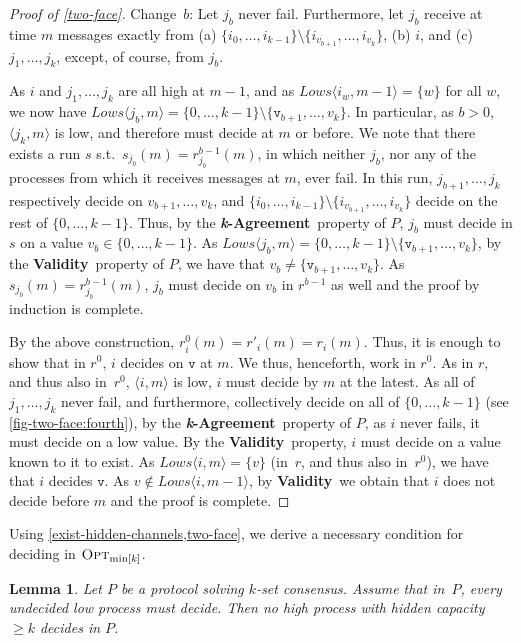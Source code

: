 \documentclass[11pt]{article}
\newtheorem{lemma}{Lemma}
\theoremstyle{definition}
\newcommand{\knownlows}[1]{\ensuremath{\mathit{Lows}\node{#1}}}
\newcommand{\OptMink}{\mbox{$\mbox{\sc Opt}_{\min[k]}$}}
\newcommand{\set}[1]{\{#1\}}
\newcommand{\defemph}[1]{\textbf{\textit{#1}}}
\newcommand{\node}[1]{\langle#1\rangle}
\newcommand{\kAgreement}{{\bf \defemph{k}-Agreement}}
\newcommand{\Validity}{{\bf Validity}}
\begin{document}
\begin{proof}[Proof of \cref{two-face}]
Change~$b$: Let $j_b$ never fail. Furthermore, let $j_b$ receive at time $m$
messages exactly from (a)
$\set{i_0,\ldots,i_{k-1}} \setminus \set{i_{v_{b+1}},\ldots,i_{v_k}}$,
(b)
$i$, and
(c)
$j_1,\ldots,j_k$, except, of course, from $j_b$.

As $i$ and $j_1,\ldots,j_k$ are all high at $m-1$, and as
$\knownlows{i_w,m-1} = \set{w}$ for all $w$, we now have
$\knownlows{j_b,m} = \set{0,\ldots,k-1} \setminus \set{\mathtt{v}_{b+1},\ldots,v_k}$.
In particular, as $b>0$, $\node{j_k,m}$ is low, and therefore must decide
at $m$ or before.
We note that there exists a run $s$ s.t.\ $s_{j_b}(m)=r_{j_b}^{b-1}(m)$,
in which neither $j_b$, nor any of the processes from which it receives messages
at $m$, ever fail. In this run, $j_{b+1},\ldots,j_k$ respectively decide on
$v_{b+1},\ldots,v_k$, and $\set{i_0,\ldots,i_{k-1}} \setminus \set{i_{v_{b+1}},\ldots,i_{v_k}}$ decide on the rest of $\set{0,\ldots,k-1}$. Thus,
by the \kAgreement\ property of $P$,
$j_b$ must decide in $s$ on a value $v_b \in \set{0,\ldots,k-1}$.
As $\knownlows{j_b,m} = \set{0,\ldots,k-1} \setminus \set{\mathtt{v}_{b+1},\ldots,v_k}$,
by the \Validity\ property of $P$, we have that $v_b \ne \set{\mathtt{v}_{b+1},\ldots,v_k}$.
As $s_{j_b}(m)=r_{j_b}^{b-1}(m)$,
$j_b$ must decide on $v_b$ in $r^{b-1}$ as well and the proof by induction is
complete.

By the above construction, $r_i^0(m)=r'_i(m)=r_i(m)$.
Thus, it is enough to show that in $r^0$, $i$ decides on $\mathtt{v}$ at $m$. We thus,
henceforth, work in $r^0$.
As in $r$, and thus also in~$r^0$, $\node{i,m}$ is low, $i$ must decide by
$m$ at the latest.
As all of $j_1,\ldots,j_k$ never fail, and furthermore, collectively
decide on all of $\set{0,\ldots,k-1}$ (see \cref{fig-two-face:fourth}), by the \kAgreement\ property of $P$,
as $i$ never fails, it must decide on a low value.
By the \Validity\ property, $i$ must decide on a value known to it to exist.
As $\knownlows{i,m}=\{v\}$ (in~$r$, and thus also in~$r^0$), we have
that $i$ decides $\mathtt{v}$. As $v \notin \knownlows{i,m-1}$, by \Validity\
we obtain that $i$ does not decide before $m$ and the proof is complete.
\end{proof}

Using \cref{exist-hidden-channels,two-face},
we derive a necessary condition for deciding in $\OptMink$.

\begin{lemma}
\label{k-set-cant-decide-before}
Let $P$ be a protocol solving $k$-set consensus.
Assume that in~$P$, every
undecided low process
must decide.
Then
no high process with hidden capacity $\ge k$ decides in $P$.
\end{lemma}
\end{document}
